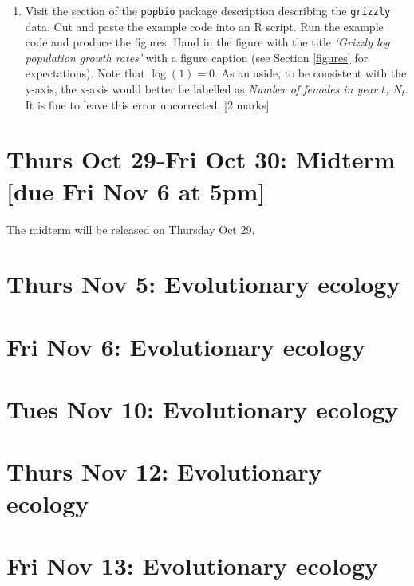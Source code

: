 \documentclass[]{book}
\providecommand{\tightlist}{%
  \setlength{\itemsep}{0pt}\setlength{\parskip}{0pt}}
\begin{document}
\begin{enumerate}
\def\labelenumi{\arabic{enumi}.}
\setcounter{enumi}{2}
\tightlist
\item
  Visit the section of the \texttt{popbio} package description
  describing the \texttt{grizzly} data. Cut and paste the example code
  into an R script. Run the example code and produce the figures. Hand
  in the figure with the title \emph{`Grizzly log population growth
  rates'} with a figure caption (see Section \ref{figures} for
  expectations). Note that \(\log(1)=0\). As an aside, to be consistent
  with the y-axis, the x-axis would better be labelled as \emph{Number
  of females in year \(t\), \(N_t\)}. It is fine to leave this error
  uncorrected. {[}2 marks{]}
\end{enumerate}

\chapter{Thurs Oct 29-Fri Oct 30: Midterm {[}due Fri Nov 6 at
5pm{]}}\label{thurs-oct-29-fri-oct-30-midterm-due-fri-nov-6-at-5pm}

The midterm will be released on Thursday Oct 29.

\chapter{Thurs Nov 5: Evolutionary
ecology}\label{thurs-nov-5-evolutionary-ecology}

\chapter{Fri Nov 6: Evolutionary
ecology}\label{fri-nov-6-evolutionary-ecology}

\chapter{Tues Nov 10: Evolutionary
ecology}\label{tues-nov-10-evolutionary-ecology}

\chapter{Thurs Nov 12: Evolutionary
ecology}\label{thurs-nov-12-evolutionary-ecology}

\chapter{Fri Nov 13: Evolutionary
ecology}\label{fri-nov-13-evolutionary-ecology}
\end{document}
